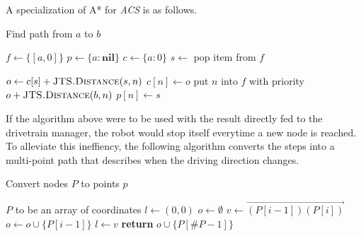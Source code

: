 \documentclass{article}
\begin{document}
A specialization of A* for \emph{ACS} is as follows.

\begin{algorithm}[H]
    \caption{Find path from $a$ to $b$}
    \begin{algorithmic}[1]
            \State $f \gets \{[a, 0]\}$ 
            \State $p \gets \{a: \mathrm{\textbf{nil}}\}$ 
            \State $c \gets \{a: 0\}$ 
                \State $s \gets $ pop item from $f$ 

                    \State \Return {} 
                \EndIf

                 
                    \State $o \gets c[s]+\Call{JTS.Distance}{s,n}$ 
                     
                        \State $c[n] \gets o$
                        \State put $n$ into $f$ with priority $o+\Call{JTS.Distance}{b,n}$
                        \State $p[n] \gets s$
                    \EndIf
                \EndFor
            \EndWhile
        \EndProcedure
    \end{algorithmic}
\end{algorithm}

 If the algorithm above were to be used with the result directly fed to the drivetrain manager, the robot would stop itself everytime a new node is reached. To alleviate this ineffiency, the following algorithm converts the steps into a multi-point path that describes when the driving direction changes.

\begin{algorithm}[H]
	\caption{Convert nodes $P$ to points $p$}
	\begin{algorithmic}[1]
		\Require $P$ to be an array of coordinates
			\State $l \gets (0,0)$ 
			\State $o \gets \emptyset$ 
			\For{$i$ \textbf{in} $[1,\#P)$} 
				\State $v \gets \overrightarrow{(P[i-1])(P[i])}$ 
					\State $o \gets o \cup \{P[i-1]\}$
					\State $l \gets v$
				\EndIf
			\EndFor
			\State \textbf{return} $o \cup \{P[\#P-1]\}$
		\EndProcedure
	\end{algorithmic}
\end{algorithm}
\end{document}
